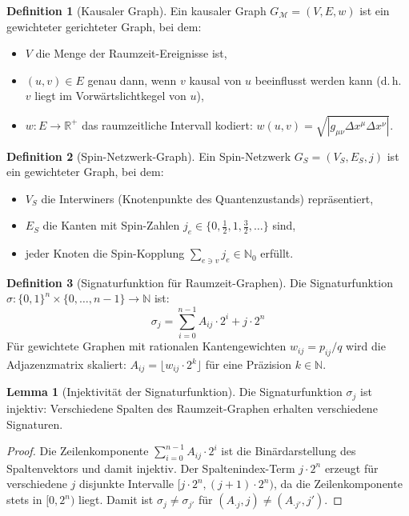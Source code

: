 ﻿\documentclass[a4paper,12pt]{article}
\theoremstyle{definition}
\newtheorem{definition}{Definition}
\newtheorem{lemma}{Lemma}
\begin{document}
\begin{definition}[Kausaler Graph]
	Ein kausaler Graph $G_{\mathcal{M}} = (V, E, w)$ ist ein gewichteter
	gerichteter Graph, bei dem:
	\begin{itemize}
		\item $V$ die Menge der Raumzeit-Ereignisse ist,
		\item $(u, v) \in E$ genau dann, wenn $v$ kausal von $u$ beeinflusst
		      werden kann (d.\,h.\ $v$ liegt im Vorw\"artslichtkegel von $u$),
		\item $w: E \to \mathbb{R}^+$ das raumzeitliche Intervall kodiert:
		      $w(u,v) = \sqrt{|g_{\mu\nu} \Delta x^\mu \Delta x^\nu|}$.
	\end{itemize}
\end{definition}

\begin{definition}[Spin-Netzwerk-Graph]
	Ein Spin-Netzwerk $G_S = (V_S, E_S, j)$ ist ein gewichteter Graph, bei dem:
	\begin{itemize}
		\item $V_S$ die Interwiners (Knotenpunkte des Quantenzustands) repr\"asentiert,
		\item $E_S$ die Kanten mit Spin-Zahlen $j_e \in \{0, \tfrac{1}{2}, 1, \tfrac{3}{2}, \ldots\}$ sind,
		\item jeder Knoten die Spin-Kopplung $\sum_{e \ni v} j_e \in \mathbb{N}_0$ erf\"ullt.
	\end{itemize}
\end{definition}

\begin{definition}[Signaturf\/unktion f\"ur Raumzeit-Graphen]
	Die Signaturfunktion $\sigma: \{0,1\}^n \times \{0,\ldots,n-1\} \to \mathbb{N}$
	ist:
	\[
	\sigma_j = \sum_{i=0}^{n-1} A_{ij} \cdot 2^i + j \cdot 2^n
	\]
	F\"ur gewichtete Graphen mit rationalen Kantengewichten $w_{ij} = p_{ij}/q$
	wird die Adjazenzmatrix skaliert: $A_{ij} = \lfloor w_{ij} \cdot 2^k \rfloor$
	f\"ur eine Pr\"azision $k \in \mathbb{N}$.
\end{definition}

\begin{lemma}[Injektivit\"at der Signaturfunktion]
\label{lem:injektiv}
	Die Signaturfunktion $\sigma_j$ ist injektiv: Verschiedene Spalten des
	Raumzeit-Graphen erhalten verschiedene Signaturen.
\end{lemma}

\begin{proof}
	Die Zeilenkomponente $\sum_{i=0}^{n-1} A_{ij} \cdot 2^i$ ist die
	Bin\"ardarstellung des Spaltenvektors und damit injektiv. Der
	Spaltenindex-Term $j \cdot 2^n$ erzeugt f\"ur verschiedene $j$ disjunkte
	Intervalle $[j \cdot 2^n, (j+1) \cdot 2^n)$, da die Zeilenkomponente
	stets in $[0, 2^n)$ liegt. Damit ist $\sigma_j \neq \sigma_{j'}$ f\"ur
	$(A_{\cdot j}, j) \neq (A_{\cdot j'}, j')$.
\end{proof}
\end{document}
